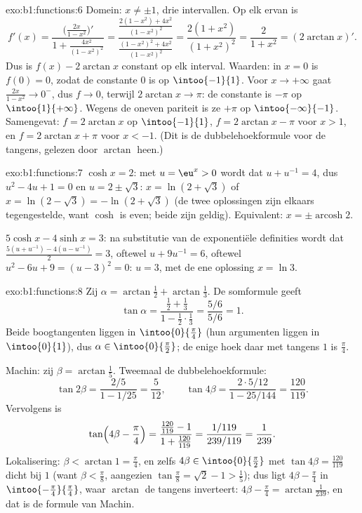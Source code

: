 \begin{solution}{exo:b1:functions:6}
Domein: $x \neq \pm 1$, drie intervallen. Op elk ervan is
\[
f'(x) = \frac{\bigl(\frac{2x}{1-x^2}\bigr)'}{1 +
\frac{4x^2}{(1-x^2)^2}}
= \frac{\frac{2(1-x^2) + 4x^2}{(1-x^2)^2}}
{\frac{(1-x^2)^2 + 4x^2}{(1-x^2)^2}}
= \frac{2(1 + x^2)}{(1 + x^2)^2} = \frac{2}{1 + x^2}
= (2\arctan x)' .
\]
Dus is $f(x) - 2\arctan x$ constant op elk interval. Waarden: in $x = 0$
is $f(0) = 0$, zodat de constante $0$ is op $\intoo{-1}{1}$. Voor $x \to
+\infty$ gaat $\frac{2x}{1-x^2} \to 0^-$, dus $f \to 0$, terwijl
$2\arctan x \to \pi$: de constante is $-\pi$ op $\intoo{1}{+\infty}$.
Wegens de oneven pariteit is ze $+\pi$ op $\intoo{-\infty}{-1}$.
Samengevat: $f = 2\arctan x$ op $\intoo{-1}{1}$, $f = 2\arctan x - \pi$
voor $x > 1$, en $f = 2\arctan x + \pi$ voor $x < -1$. (Dit is de
dubbelehoekformule voor de tangens, gelezen door $\arctan$ heen.)
\end{solution}

\begin{solution}{exo:b1:functions:7}
$\cosh x = 2$: met $u = \eu^x > 0$ wordt dat $u + u^{-1} = 4$, dus $u^2
- 4u + 1 = 0$ en $u = 2 \pm \sqrt 3$: $x = \ln(2 + \sqrt 3)$ of $x =
\ln(2 - \sqrt 3) = -\ln(2 + \sqrt 3)$ (de twee oplossingen zijn
elkaars tegengestelde, want $\cosh$ is even; beide zijn geldig).
Equivalent: $x = \pm \operatorname{arcosh} 2$.

$5\cosh x - 4\sinh x = 3$: na substitutie van de exponentiële definities
wordt dat $\frac{5(u + u^{-1}) - 4(u - u^{-1})}{2} = 3$, oftewel $u +
9u^{-1} = 6$, oftewel $u^2 - 6u + 9 = (u - 3)^2 = 0$: $u = 3$, met de
ene oplossing $x = \ln 3$.
\end{solution}

\begin{solution}{exo:b1:functions:8}
Zij $\alpha = \arctan\frac12 + \arctan\frac13$. De somformule geeft
\[
\tan\alpha = \frac{\frac12 + \frac13}{1 - \frac12\cdot\frac13}
= \frac{5/6}{5/6} = 1 .
\]
Beide boogtangenten liggen in $\intoo{0}{\frac\pi4}$ (hun argumenten
liggen in $\intoo{0}{1}$), dus $\alpha \in \intoo{0}{\frac\pi2}$; de
enige hoek daar met tangens $1$ is $\frac\pi4$.

Machin: zij $\beta = \arctan\frac15$. Tweemaal de dubbelehoekformule:
\[
\tan 2\beta = \frac{2/5}{1 - 1/25} = \frac{5}{12},
\qquad
\tan 4\beta = \frac{2 \cdot 5/12}{1 - 25/144} = \frac{120}{119}.
\]
Vervolgens is
\[
\tan\Bigl(4\beta - \frac\pi4\Bigr)
= \frac{\frac{120}{119} - 1}{1 + \frac{120}{119}}
= \frac{1/119}{239/119} = \frac{1}{239}.
\]
Lokalisering: $\beta < \arctan 1 = \frac\pi4$, en zelfs $4\beta \in
\intoo{0}{\frac\pi2}$ met $\tan 4\beta = \frac{120}{119}$ dicht bij $1$
(want $\beta < \frac\pi8$, aangezien $\tan\frac\pi8 = \sqrt 2 - 1 >
\frac15$); dus ligt $4\beta - \frac\pi4$ in
$\intoo{-\frac\pi4}{\frac\pi4}$, waar $\arctan$ de tangens inverteert:
$4\beta - \frac\pi4 = \arctan\frac{1}{239}$, en dat is de formule van
Machin.
\end{solution}

